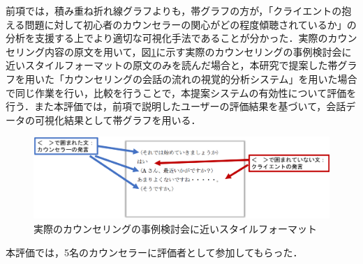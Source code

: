 \documentclass[shuuron]{kuee}
\begin{document}


前項では，積み重ね折れ線グラフよりも，帯グラフの方が，「クライエントの抱える問題に対して初心者のカウンセラーの関心がどの程度傾聴されているか」の分析を支援する上でより適切な可視化手法であることが分かった．実際のカウンセリング内容の原文を用いて，図\ref{fig:pdf}に示す実際のカウンセリングの事例検討会に近いスタイルフォーマットの原文のみを読んだ場合と，本研究で提案した帯グラフを用いた「カウンセリングの会話の流れの視覚的分析システム」を用いた場合で同じ作業を行い，比較を行うことで，本提案システムの有効性について評価を行う．また本評価では，前項で説明したユーザーの評価結果を基づいて，会話データの可視化結果として帯グラフを用いる．

\begin{figure}
  \begin{center}
    \includegraphics[width=\linewidth]{pdf.png}
  \end{center}
  \caption{実際のカウンセリングの事例検討会に近いスタイルフォーマット}
  \label{fig:pdf}
\end{figure}


本評価では，5名のカウンセラーに評価者として参加してもらった．

\end{document}
